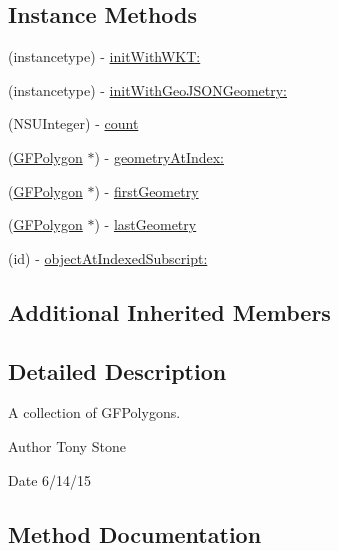 \subsection*{Instance Methods}
\begin{DoxyCompactItemize}
\item 
(instancetype) -\/ \hyperlink{interface_g_f_multi_polygon_a321e0b2c64e6dbe079205f1c58a17a2f}{init\+With\+W\+K\+T\+:}
\item 
(instancetype) -\/ \hyperlink{interface_g_f_multi_polygon_a2c8f29141e272aad174a9f65190d7cab}{init\+With\+Geo\+J\+S\+O\+N\+Geometry\+:}
\item 
(N\+S\+U\+Integer) -\/ \hyperlink{interface_g_f_multi_polygon_a268a15cb86f1a8a57bb9f7c7f07b6443}{count}
\item 
(\hyperlink{interface_g_f_polygon}{G\+F\+Polygon} $\ast$) -\/ \hyperlink{interface_g_f_multi_polygon_ab18a262a8d02f4b15250bad1d8073f2a}{geometry\+At\+Index\+:}
\item 
(\hyperlink{interface_g_f_polygon}{G\+F\+Polygon} $\ast$) -\/ \hyperlink{interface_g_f_multi_polygon_a7dca748ca40ba2e1de638d4aaf251144}{first\+Geometry}
\item 
(\hyperlink{interface_g_f_polygon}{G\+F\+Polygon} $\ast$) -\/ \hyperlink{interface_g_f_multi_polygon_a8aa2546c3a714b390a5d2580d1356b62}{last\+Geometry}
\item 
(id) -\/ \hyperlink{interface_g_f_multi_polygon_a9336b76baf557cba039569fcf0c5dcd0}{object\+At\+Indexed\+Subscript\+:}
\end{DoxyCompactItemize}
\subsection*{Additional Inherited Members}


\subsection{Detailed Description}
A collection of G\+F\+Polygons. 

\begin{DoxyAuthor}{Author}
Tony Stone 
\end{DoxyAuthor}
\begin{DoxyDate}{Date}
6/14/15 
\end{DoxyDate}


\subsection{Method Documentation}
\hypertarget{interface_g_f_multi_polygon_a321e0b2c64e6dbe079205f1c58a17a2f}{}

